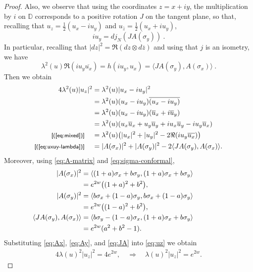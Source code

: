 \documentclass[a4paper,11pt,openright,twoside]{book}
\newcommand{\then}{\Rightarrow}
\newcommand{\1}{\mathds{1}}
\newcommand{\commb}[1]{\textsf{{\footnotesize[#1]}}}
\newcommand{\qref}[1]{(\ref{#1})}
\theoremstyle{plain}
\theoremstyle{definition}
\theoremstyle{remark}
\begin{document}
\begin{proof}
Also, we observe that using the coordinates $z = x+iy$, the multiplication by $i$ on $\mathbb D$ corresponds to a positive rotation $J$ on the tangent plane, so that, recalling that $u_z=\frac12(u_x-iu_y)$ and $u_{\bar z}=\frac12(u_x+iu_y)$,
\[
iu_y=dj_N(J A(\sigma_y))\ .
\]
In particular, recalling that $|dz|^2 = \Re(dz \otimes d\overline{z})$ and using that $j$ is an isometry, we have
\begin{equation}\label{eq:mixed}
\lambda^2(u)\Re(iu_y\overline{u_x})
=
h(iu_y,u_x)
=
\langle J A(\sigma_y),A(\sigma_x)\rangle\ .
\end{equation}
Then we obtain
\begin{align}
4\lambda^2(u)|u_z|^2\notag
&= \lambda^2(u) |u_x-iu_y|^2 \hspace{2cm}\notag\\
&= \lambda^2(u) (u_x-iu_y) \overline{(u_x-iu_y)} \notag\\
&= \lambda^2(u) (u_x-iu_y) (\overline{u}_x+i\overline{u}_y) \notag\\
&= \lambda^2(u) (u_x \overline{u}_x +u_y \overline{u}_y + i u_x \overline{u}_y - i u_y \overline{u}_x) \notag\\
\commb{\qref{eq:mixed}}\hspace{4mm}&=\lambda^2(u)\bigl(|u_x|^2+|u_y|^2-2\Re(iu_y\overline{u_x})\bigr)\notag\\
	\commb{\qref{eq:uxuy-lambda}}\hspace{4mm}&=|A(\sigma_x)|^2+|A(\sigma_y)|^2-2\langle J A(\sigma_y),A(\sigma_x)\rangle.
\label{eq:uz}
\end{align}
Moreover, using \eqref{eq:A-matrix} and \eqref{eq:sigma-conformal},
\begin{align}
|A(\sigma_x)|^2
&=\langle (1+a)\sigma_x+b\sigma_y,(1+a)\sigma_x+b\sigma_y\rangle \hspace{2cm}\notag\\
&=e^{2w}\bigl((1+a)^2+b^2\bigr), \label{eq:Ax}
\\
	|A(\sigma_y)|^2 &=\langle b\sigma_x+(1-a)\sigma_y,b\sigma_x+(1-a)\sigma_y\rangle \notag\\
&=e^{2w}\bigl((1-a)^2+b^2\bigr), \label{eq:Ay}
\\
\hspace{4mm}
 \langle J A(\sigma_y),A(\sigma_x)\rangle
&=\langle b\sigma_y-(1-a)\sigma_x,(1+a)\sigma_x+b\sigma_y\rangle \hspace{2cm}\notag\\
&=e^{2w}(a^2+b^2-1). \label{eq:JA}
\end{align}
Substituting \eqref{eq:Ax}, \eqref{eq:Ay}, and \eqref{eq:JA} into \eqref{eq:uz} we obtain
\begin{align}\label{eq:lamew}
4\lambda(u)^2|u_z|^2=4e^{2w}, \quad\then \quad
\lambda(u)^2|u_z|^2=e^{2w}.
\end{align}


\end{proof}
\end{document}
